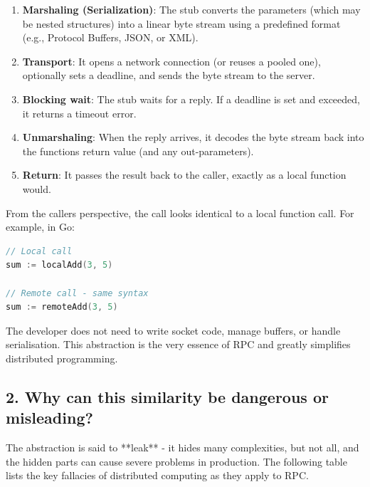 \documentclass[a4paper]{article}
\begin{document}
\begin{enumerate}
    \item \textbf{Marshaling (Serialization)}: The stub converts the parameters (which may be nested structures) into a linear byte stream using a predefined format (e.g., Protocol Buffers, JSON, or XML).
    \item \textbf{Transport}: It opens a network connection (or reuses a pooled one), optionally sets a deadline, and sends the byte stream to the server.
    \item \textbf{Blocking wait}: The stub waits for a reply. If a deadline is set and exceeded, it returns a timeout error.
    \item \textbf{Unmarshaling}: When the reply arrives, it decodes the byte stream back into the functions return value (and any out-parameters).
    \item \textbf{Return}: It passes the result back to the caller, exactly as a local function would.
\end{enumerate}

From the callers perspective, the call looks identical to a local function call. For example, in Go:

\begin{lstlisting}[language=Go]
// Local call
sum := localAdd(3, 5)

// Remote call - same syntax
sum := remoteAdd(3, 5)
\end{lstlisting}

The developer does not need to write socket code, manage buffers, or handle serialisation. This abstraction is the very essence of RPC and greatly simplifies distributed programming.

\subsection{2. Why can this similarity be dangerous or misleading?}

The abstraction is said to **leak** - it hides many complexities, but not all, and the hidden parts can cause severe problems in production. The following table lists the key fallacies of distributed computing as they apply to RPC.
\end{document}
